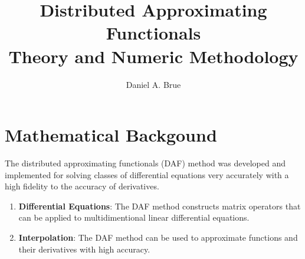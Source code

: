\documentclass[letterpaper]{article}
\begin{document}
\title{%
    Distributed Approximating Functionals\\
    \vspace{0.5cm}
    \large{Theory and Numeric Methodology}\\
}
\author{Daniel A. Brue}
\maketitle
\section{Mathematical Backgound}

The distributed approximating functionals (DAF) method was developed 
and implemented for solving classes of differential equations very accurately
with a high fidelity to the accuracy of derivatives. 

\begin{enumerate}
\item{\bf Differential Equations}: The DAF method constructs matrix operators that
	can be applied to multidimentional linear differential equations. 
\item{\bf Interpolation}: The DAF method can be used to approximate functions and
	their derivatives with high accuracy. 
\end{enumerate}
\end{document}
